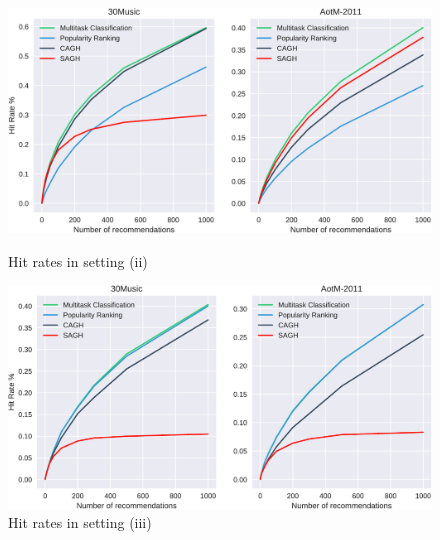 \begin{figure}[t]
    \centering
    \begin{minipage}{.5\textwidth}
        \centering
        \includegraphics[width=.925\linewidth]{fig/hitrate1.pdf}
        \caption{Hit rates in setting (ii)}
        \label{fig:hr1}
    \end{minipage}%
    \begin{minipage}{0.5\textwidth}
        \centering
        \includegraphics[width=.925\linewidth]{fig/hitrate2.pdf}
        \caption{Hit rates in setting (iii)}
        \label{fig:hr2}
    \end{minipage}
\end{figure}



